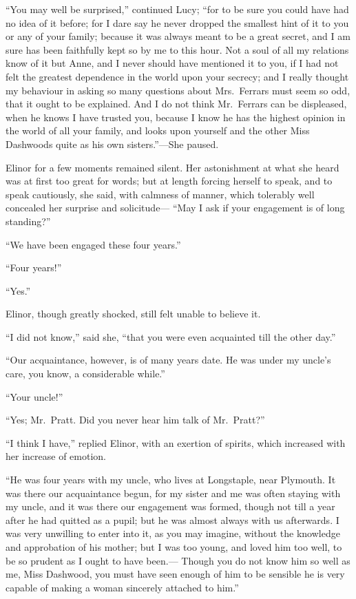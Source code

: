 \documentclass{article}
\begin{document}
``You may well be surprised,'' continued Lucy;
``for to be sure you could have had no idea of it before;
for I dare say he never dropped the smallest hint of it
to you or any of your family; because it was always meant
to be a great secret, and I am sure has been faithfully
kept so by me to this hour.  Not a soul of all my relations
know of it but Anne, and I never should have mentioned
it to you, if I had not felt the greatest dependence
in the world upon your secrecy; and I really thought my
behaviour in asking so many questions about Mrs.\ Ferrars
must seem so odd, that it ought to be explained.
And I do not think Mr.\ Ferrars can be displeased,
when he knows I have trusted you, because I know he has
the highest opinion in the world of all your family,
and looks upon yourself and the other Miss Dashwoods quite
as his own sisters.''---She paused.

Elinor for a few moments remained silent.
Her astonishment at what she heard was at first too
great for words; but at length forcing herself to speak,
and to speak cautiously, she said, with calmness of manner,
which tolerably well concealed her surprise and solicitude---%
``May I ask if your engagement is of long standing?''

``We have been engaged these four years.''

``Four years!''

``Yes.''

Elinor, though greatly shocked, still felt unable
to believe it.

``I did not know,'' said she, ``that you were even
acquainted till the other day.''

``Our acquaintance, however, is of many years date.
He was under my uncle's care, you know, a considerable while.''

``Your uncle!''

``Yes; Mr.\ Pratt.  Did you never hear him talk
of Mr.\ Pratt?''

``I think I have,'' replied Elinor, with an exertion
of spirits, which increased with her increase of emotion.

``He was four years with my uncle, who lives at Longstaple,
near Plymouth.  It was there our acquaintance begun,
for my sister and me was often staying with my uncle,
and it was there our engagement was formed, though not till
a year after he had quitted as a pupil; but he was almost
always with us afterwards.  I was very unwilling to enter
into it, as you may imagine, without the knowledge and
approbation of his mother; but I was too young, and loved
him too well, to be so prudent as I ought to have been.---%
Though you do not know him so well as me, Miss Dashwood,
you must have seen enough of him to be sensible he is
very capable of making a woman sincerely attached to him.''
\end{document}
